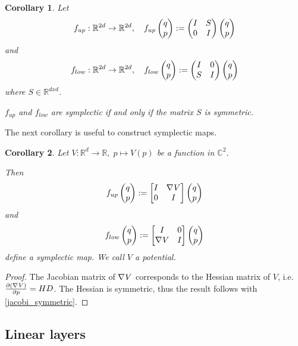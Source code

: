 \documentclass[twoside,a4paper]{article}
\newtheorem{corollary}{Corollary}
\begin{document}
\begin{corollary}\label{matrix_symmetric}
	Let
	\begin{equation*}
		f_{up} : \mathbb{R}^{2d} \to \mathbb{R}^{2d},\quad
		f_{up} \begin{pmatrix} q \\ p \end{pmatrix} := \begin{pmatrix}
			I & S \\
			0 & I
		\end{pmatrix} \begin{pmatrix} q \\ p \end{pmatrix}
	\end{equation*}
	and
	\begin{equation*}
		f_{low} : \mathbb{R}^{2d} \to \mathbb{R}^{2d},\quad
		f_{low} \begin{pmatrix} q \\ p \end{pmatrix} := \begin{pmatrix}
			I & 0 \\
			S & I
		\end{pmatrix} \begin{pmatrix} q \\ p \end{pmatrix}
	\end{equation*}
	where $S \in \mathbb{R}^{dxd}$. 

	$f_{up}$ and $f_{low}$ are symplectic if and only if the matrix $S$
	is symmetric.
\end{corollary}

The next corollary is useful to construct symplectic maps.
\begin{corollary}\label{gradient_corollary}
	Let $V: \mathbb{R}^d \to \mathbb{R}, \; p \mapsto V(p)$ be a function in 
	$\mathbb{C}^2$. 
	
	Then
	\begin{equation*}
		f_{up} \begin{pmatrix} q \\ p \end{pmatrix} := \begin{bmatrix} I & {\nabla_{}{V}} \\ 0 & I \end{bmatrix} \begin{pmatrix} q \\ p \end{pmatrix}
	\end{equation*}
	and
	\begin{equation*}
		f_{low} \begin{pmatrix} q \\ p \end{pmatrix} := \begin{bmatrix} I & 0 \\ {\nabla_{}{V}} & I \end{bmatrix} \begin{pmatrix} q \\ p \end{pmatrix}
	\end{equation*}
	define a symplectic map. We call $V$ a potential.
\end{corollary}
\begin{proof}
	The Jacobian matrix of $\nabla_{}{V}$ corresponds to the Hessian matrix of $V$,
	i.e. $\frac{\partial (\nabla_{}{V})}{\partial p} = HD$. 
	The Hessian is symmetric, thus the result follows with \cref{jacobi_symmetric}.
\end{proof}


\subsection{Linear layers}
\end{document}
